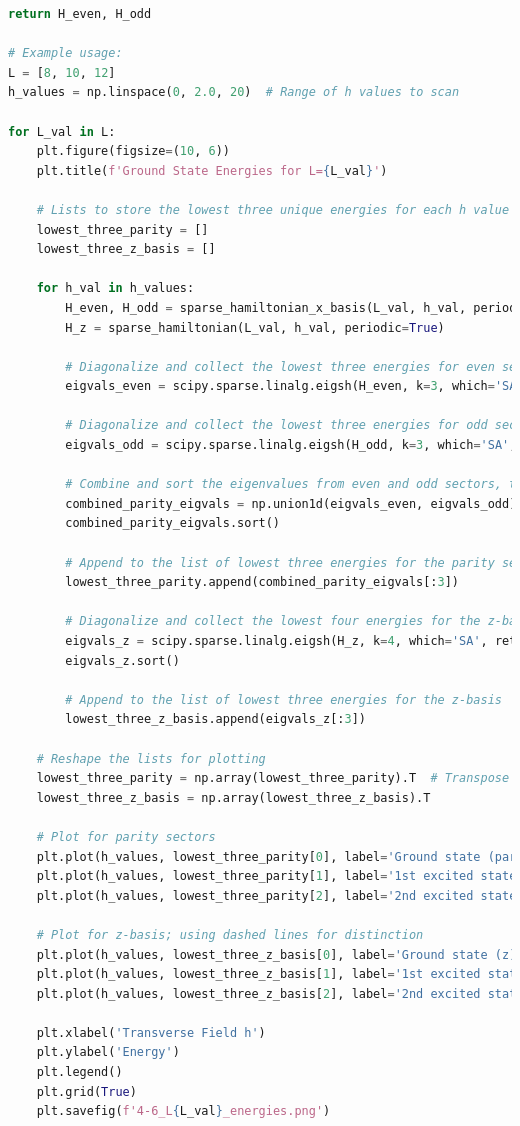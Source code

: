 \documentclass[12pt]{article}
\begin{document}
\begin{lstlisting}[language=Python]
    return H_even, H_odd

# Example usage:
L = [8, 10, 12]
h_values = np.linspace(0, 2.0, 20)  # Range of h values to scan

for L_val in L:
    plt.figure(figsize=(10, 6))
    plt.title(f'Ground State Energies for L={L_val}')
    
    # Lists to store the lowest three unique energies for each h value
    lowest_three_parity = []
    lowest_three_z_basis = []

    for h_val in h_values:
        H_even, H_odd = sparse_hamiltonian_x_basis(L_val, h_val, periodic=True)
        H_z = sparse_hamiltonian(L_val, h_val, periodic=True)

        # Diagonalize and collect the lowest three energies for even sector
        eigvals_even = scipy.sparse.linalg.eigsh(H_even, k=3, which='SA', return_eigenvectors=False)
        
        # Diagonalize and collect the lowest three energies for odd sector
        eigvals_odd = scipy.sparse.linalg.eigsh(H_odd, k=3, which='SA', return_eigenvectors=False)
        
        # Combine and sort the eigenvalues from even and odd sectors, then take the lowest three
        combined_parity_eigvals = np.union1d(eigvals_even, eigvals_odd)
        combined_parity_eigvals.sort()
        
        # Append to the list of lowest three energies for the parity sectors
        lowest_three_parity.append(combined_parity_eigvals[:3])

        # Diagonalize and collect the lowest four energies for the z-basis for comparison
        eigvals_z = scipy.sparse.linalg.eigsh(H_z, k=4, which='SA', return_eigenvectors=False)
        eigvals_z.sort()

        # Append to the list of lowest three energies for the z-basis
        lowest_three_z_basis.append(eigvals_z[:3])

    # Reshape the lists for plotting
    lowest_three_parity = np.array(lowest_three_parity).T  # Transpose to match h_values shape
    lowest_three_z_basis = np.array(lowest_three_z_basis).T

    # Plot for parity sectors
    plt.plot(h_values, lowest_three_parity[0], label='Ground state (parity)')
    plt.plot(h_values, lowest_three_parity[1], label='1st excited state (parity)')
    plt.plot(h_values, lowest_three_parity[2], label='2nd excited state (parity)')

    # Plot for z-basis; using dashed lines for distinction
    plt.plot(h_values, lowest_three_z_basis[0], label='Ground state (z)', linestyle='--')
    plt.plot(h_values, lowest_three_z_basis[1], label='1st excited state (z)', linestyle='--')
    plt.plot(h_values, lowest_three_z_basis[2], label='2nd excited state (z)', linestyle='--')

    plt.xlabel('Transverse Field h')
    plt.ylabel('Energy')
    plt.legend()
    plt.grid(True)
    plt.savefig(f'4-6_L{L_val}_energies.png')  
\end{lstlisting}
\end{document}
